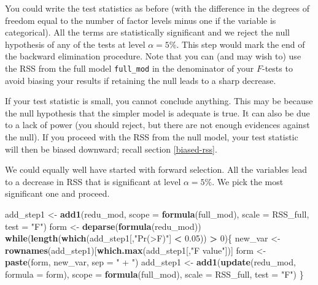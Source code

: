 \documentclass[]{book}
\newenvironment{Shaded}{\begin{snugshade}}{\end{snugshade}}
\newcommand{\ControlFlowTok}[1]{\textcolor[rgb]{0.13,0.29,0.53}{\textbf{#1}}}
\newcommand{\DataTypeTok}[1]{\textcolor[rgb]{0.13,0.29,0.53}{#1}}
\newcommand{\DecValTok}[1]{\textcolor[rgb]{0.00,0.00,0.81}{#1}}
\newcommand{\FloatTok}[1]{\textcolor[rgb]{0.00,0.00,0.81}{#1}}
\newcommand{\KeywordTok}[1]{\textcolor[rgb]{0.13,0.29,0.53}{\textbf{#1}}}
\newcommand{\NormalTok}[1]{#1}
\newcommand{\OperatorTok}[1]{\textcolor[rgb]{0.81,0.36,0.00}{\textbf{#1}}}
\newcommand{\StringTok}[1]{\textcolor[rgb]{0.31,0.60,0.02}{#1}}
\theoremstyle{definition}
\theoremstyle{definition}
\theoremstyle{definition}
\theoremstyle{remark}
\begin{document}
You could write the test statistics as before (with the difference in the degrees of freedom equal to the number of factor levels minus one if the variable is categorical). All the terms are statistically significant and we reject the null hypothesis of any of the tests at level \(\alpha = 5\%\). This step would mark the end of the backward elimination procedure. Note that you can (and may wish to) use the RSS from the full model \texttt{full\_mod} in the denominator of your \(F\)-tests to avoid biasing your results if retaining the null leads to a sharp decrease.

If your test statistic is small, you cannot conclude anything. This may be because the null hypothesis that the simpler model is adequate is true. It can also be due to a lack of power (you should reject, but there are not enough evidences against the null). If you proceed with the RSS from the null model, your test statistic will then be biased downward; recall section \ref{biased-rss}.

We could equally well have started with forward selection. All the variables lead to a decrease in RSS that is significant at level \(\alpha = 5\%\). We pick the most significant one and proceed.

\begin{Shaded}
\begin{Highlighting}[]
\NormalTok{add_step1 <-}\StringTok{ }\KeywordTok{add1}\NormalTok{(redu_mod, }\DataTypeTok{scope =} \KeywordTok{formula}\NormalTok{(full_mod), }\DataTypeTok{scale =}\NormalTok{ RSS_full, }\DataTypeTok{test =} \StringTok{"F"}\NormalTok{)}
\NormalTok{form <-}\StringTok{ }\KeywordTok{deparse}\NormalTok{(}\KeywordTok{formula}\NormalTok{(redu_mod))}
\ControlFlowTok{while}\NormalTok{(}\KeywordTok{length}\NormalTok{(}\KeywordTok{which}\NormalTok{(add_step1[,}\StringTok{"Pr(>F)"}\NormalTok{] }\OperatorTok{<}\StringTok{ }\FloatTok{0.05}\NormalTok{)) }\OperatorTok{>}\StringTok{ }\DecValTok{0}\NormalTok{)\{}
\NormalTok{  new_var <-}\StringTok{ }\KeywordTok{rownames}\NormalTok{(add_step1)[}\KeywordTok{which.max}\NormalTok{(add_step1[,}\StringTok{"F value"}\NormalTok{])]}
\NormalTok{  form <-}\StringTok{ }\KeywordTok{paste}\NormalTok{(form, new_var, }\DataTypeTok{sep =} \StringTok{" + "}\NormalTok{)}
\NormalTok{  add_step1 <-}\StringTok{ }\KeywordTok{add1}\NormalTok{(}\KeywordTok{update}\NormalTok{(redu_mod, }\DataTypeTok{formula =}\NormalTok{ form), }
                    \DataTypeTok{scope =} \KeywordTok{formula}\NormalTok{(full_mod), }\DataTypeTok{scale =}\NormalTok{ RSS_full, }\DataTypeTok{test =} \StringTok{"F"}\NormalTok{)}
\NormalTok{\}}
\end{Highlighting}
\end{Shaded}
\end{document}
